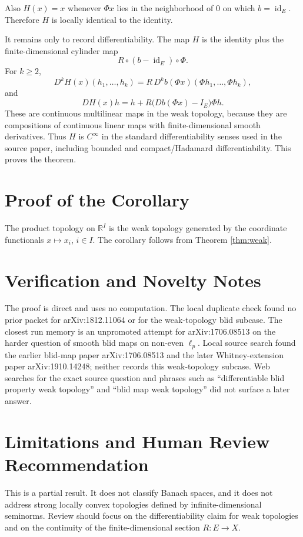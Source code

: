 \documentclass[11pt]{amsart}
\newcommand{\R}{\mathbb R}
\newcommand{\id}{\operatorname{id}}
\begin{document}
Also \(H(x)=x\) whenever \(\Phi x\) lies in the neighborhood of \(0\) on which
\(b=\id_E\).  Therefore \(H\) is locally identical to the identity.

It remains only to record differentiability.  The map \(H\) is the identity
plus the finite-dimensional cylinder map
\[
  R\circ(b-\id_E)\circ\Phi .
\]
For \(k\ge2\),
\[
  D^kH(x)(h_1,\ldots,h_k)
  =R\,D^k b(\Phi x)(\Phi h_1,\ldots,\Phi h_k),
\]
and
\[
  DH(x)h=h+R\bigl(Db(\Phi x)-I_E\bigr)\Phi h .
\]
These are continuous multilinear maps in the weak topology, because they are
compositions of continuous linear maps with finite-dimensional smooth
derivatives.  Thus \(H\) is \(C^\infty\) in the standard differentiability
senses used in the source paper, including bounded and compact/Hadamard
differentiability.  This proves the theorem.

\section*{Proof of the Corollary}

The product topology on \(\R^I\) is the weak topology generated by the
coordinate functionals \(x\mapsto x_i\), \(i\in I\).  The corollary follows
from Theorem \ref{thm:weak}.

\section*{Verification and Novelty Notes}

The proof is direct and uses no computation.  The local duplicate check found
no prior packet for arXiv:1812.11064 or for the weak-topology blid subcase.
The closest run memory is an unpromoted attempt for arXiv:1706.08513 on the
harder question of smooth blid maps on non-even \(\ell_p\).  Local source
search found the earlier blid-map paper arXiv:1706.08513 and the later
Whitney-extension paper arXiv:1910.14248; neither records this weak-topology
subcase.  Web searches for the exact source question and phrases such as
``differentiable blid property weak topology'' and ``blid map weak topology''
did not surface a later answer.

\section*{Limitations and Human Review Recommendation}

This is a partial result.  It does not classify Banach spaces, and it does not
address strong locally convex topologies defined by infinite-dimensional
seminorms.  Review should focus on the differentiability claim for weak
topologies and on the continuity of the finite-dimensional section \(R:E\to X\).
\end{document}
